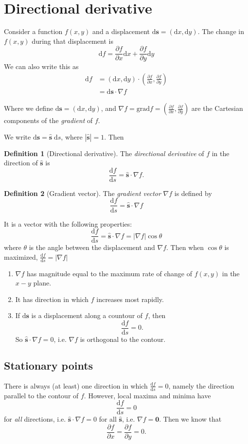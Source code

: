 \documentclass[a4paper]{article}
\theoremstyle{definition}
\newtheorem*{defi}{Definition}
\newcommand{\mb}[1]{\mathbf{#1}}
\renewcommand{\d}{\mathrm{d}}
\let\stdsection\section
\renewcommand\section{\newpage\stdsection}
\begin{document}
\section{Directional derivative}
\label{sec:directional-derivative}
Consider a function $f(x, y)$ and a displacement $\d\mb{s} = (\d x, \d y)$. The change in $f(x, y)$ during that displacement is 
\[
\d f = \frac{\partial f}{\partial x}\d x + \frac{\partial f}{\partial y}\d y
\]
We can also write this as 
\begin{align*}
  \d f &= (\d x, \d y)\cdot \left(\frac{\partial f}{\partial x}, \frac{\partial f}{\partial y}\right)\\
  &= \d\mb{s}\cdot \nabla f
\end{align*}

Where we define $\d \mb{s} = (\d x, \d y)$, and $\nabla f = \mathrm{grad}f = \left(\frac{\partial f}{\partial x}, \frac{\partial f}{\partial y}\right)$ are the Cartesian components of the \emph{gradient} of $f$.

We write $\d\mb{s} = \hat{\mb{s}}\;\d s$, where $|\hat{\mb{s}}| = 1$. Then
\begin{defi}[Directional derivative]
  The \emph{directional derivative} of $f$ in the direction of $\hat{\mb{s}}$ is
  \[
  \frac{\d f}{\d s} = \hat{\mb{s}}\cdot \nabla f.
  \]
\end{defi}

\begin{defi}[Gradient vector]
  The \emph{gradient vector} $\nabla f$ is defined by
  \[
  \frac{\d f}{\d s} = \mb{\hat{s}}\cdot \nabla f
  \]
\end{defi}
It is a vector with the following properties: 
\[
\frac{\d f}{\d s} = \mb{\hat{s}}\cdot \nabla f = |\nabla f| \cos \theta
\]
where $\theta$ is the angle between the displacement and $\nabla f$. Then when $\cos\theta$ is maximized, $\frac{\d f}{\d s} = |\nabla f|$

\begin{enumerate}
\item $\nabla f$ has magnitude equal to the maximum rate of change of $f(x, y)$ in the $x-y$ plane.
\item It has direction in which $f$ increases most rapidly.
\item If $\d\mb{s}$ is a displacement along a countour of $f$, then
\[
\frac{\d f}{\d s} = 0.
\]
So $\mb{\hat{s}}\cdot \nabla f = 0$, i.e. $\nabla f$ is orthogonal to the contour.
\end{enumerate}
\subsection{Stationary points}
There is always (at least) one direction in which $\frac{\d f}{\d s} = 0$, namely the direction parallel to the contour of $f$. However, local maxima and minima have 
\[
\frac{\d f}{\d s} = 0
\]
for \emph{all} directions, i.e. $\mb{\hat{s}}\cdot \nabla f = 0$ for all $\mb{\hat{s}}$, i.e. $\nabla f = \mb{0}$. Then we know that
\[
\frac{\partial f}{\partial x} = \frac{\partial f}{\partial y} = 0.
\]
\pagebreak %
\end{document}
